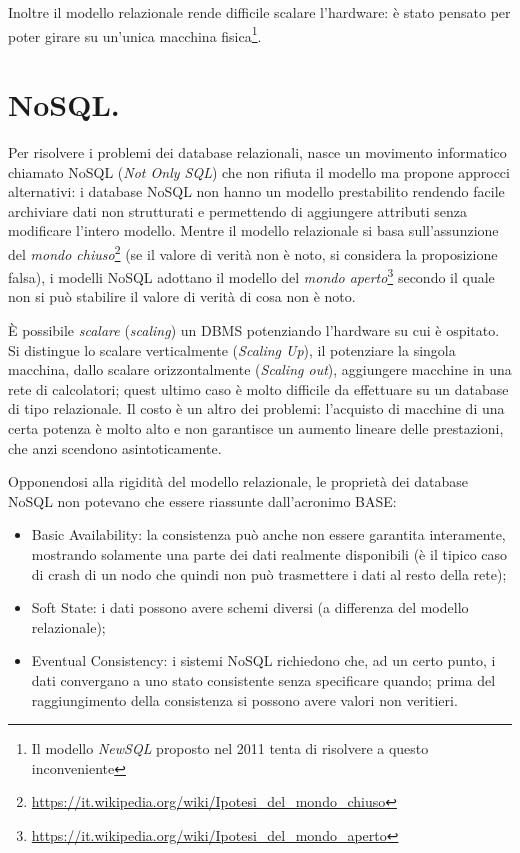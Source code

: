 \documentclass[a4page, 11pt]{article}
\begin{document}
Inoltre il modello relazionale rende difficile scalare l'hardware: è stato pensato per poter girare su un'unica macchina fisica\footnote{Il modello \textit{NewSQL} proposto nel 2011 tenta di risolvere a questo inconveniente}.


\section{NoSQL.}
Per risolvere i problemi dei database relazionali, nasce un movimento informatico chiamato NoSQL (\textit{Not Only SQL}) che non rifiuta il modello ma propone approcci alternativi: i database NoSQL non hanno un modello prestabilito rendendo facile archiviare dati non strutturati e permettendo di aggiungere attributi senza modificare l'intero modello.
Mentre il modello relazionale si basa sull'assunzione del \textit{mondo chiuso}\footnote{\url{https://it.wikipedia.org/wiki/Ipotesi_del_mondo_chiuso}} (se il valore di verità non è noto, si considera la proposizione falsa), i modelli NoSQL adottano il modello del \textit{mondo aperto}\footnote{\url{https://it.wikipedia.org/wiki/Ipotesi_del_mondo_aperto}} secondo il quale non si può stabilire il valore di verità di cosa non è noto.

È possibile \textit{scalare} (\textit{scaling}) un DBMS potenziando l'hardware su cui è ospitato.
Si distingue lo scalare verticalmente (\textit{Scaling Up}), il potenziare la singola macchina, dallo scalare orizzontalmente (\textit{Scaling out}), aggiungere macchine in una rete di calcolatori; quest ultimo caso è molto difficile da effettuare su un database di tipo relazionale.
Il costo è un altro dei problemi: l'acquisto di macchine di una certa potenza è molto alto e non garantisce un aumento lineare delle prestazioni, che anzi scendono asintoticamente.

Opponendosi alla rigidità del modello relazionale, le proprietà dei database NoSQL non potevano che essere riassunte dall'acronimo BASE:
\begin{itemize}
\item Basic Availability: la consistenza può anche non essere garantita interamente, mostrando solamente una parte dei dati realmente disponibili (è il tipico caso di crash di un nodo che quindi non può trasmettere i dati al resto della rete);
\item Soft State: i dati possono avere schemi diversi (a differenza del modello relazionale);
\item Eventual Consistency: i sistemi NoSQL richiedono che, ad un certo punto, i dati convergano a uno stato consistente senza specificare quando; prima del raggiungimento della consistenza si possono avere valori non veritieri.
\end{itemize}
\end{document}
